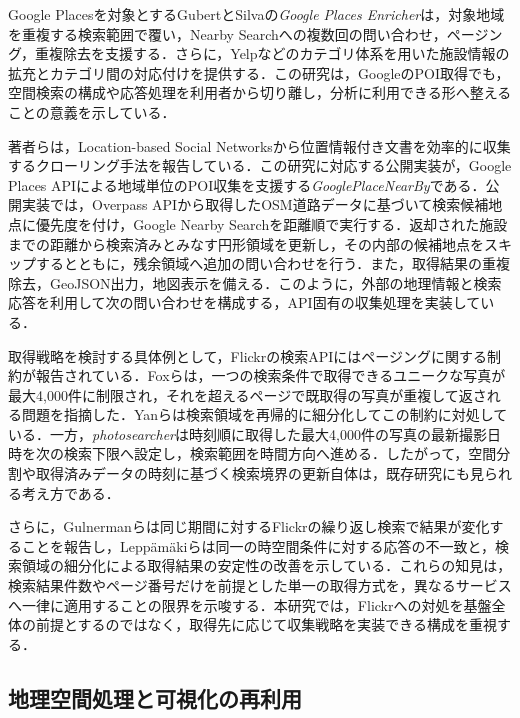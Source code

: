 Google Placesを対象とするGubertとSilvaの\textit{Google Places Enricher}は，対象地域を重複する検索範囲で覆い，Nearby Searchへの複数回の問い合わせ，ページング，重複除去を支援する．さらに，Yelpなどのカテゴリ体系を用いた施設情報の拡充とカテゴリ間の対応付けを提供する\cite{gubert2022placesenricher}．この研究は，GoogleのPOI取得でも，空間検索の構成や応答処理を利用者から切り離し，分析に利用できる形へ整えることの意義を示している．

著者らは，Location-based Social Networksから位置情報付き文書を効率的に収集するクローリング手法を報告している\cite{yokoyama2019efficientcrawling}．この研究に対応する公開実装が，Google Places APIによる地域単位のPOI収集を支援する\textit{GooglePlaceNearBy}である\cite{yokoyama2020googleplacenearby}．公開実装では，Overpass APIから取得したOSM道路データに基づいて検索候補地点に優先度を付け，Google Nearby Searchを距離順で実行する．返却された施設までの距離から検索済みとみなす円形領域を更新し，その内部の候補地点をスキップするとともに，残余領域へ追加の問い合わせを行う．また，取得結果の重複除去，GeoJSON出力，地図表示を備える．このように，外部の地理情報と検索応答を利用して次の問い合わせを構成する，API固有の収集処理を実装している．

取得戦略を検討する具体例として，Flickrの検索APIにはページングに関する制約が報告されている．Foxらは，一つの検索条件で取得できるユニークな写真が最大4,000件に制限され，それを超えるページで既取得の写真が重複して返される問題を指摘した\cite{fox2020photosearcher}．Yanらは検索領域を再帰的に細分化してこの制約に対処している\cite{yan2017postdisaster,yan2019flickrtags}．一方，\textit{photosearcher}は時刻順に取得した最大4,000件の写真の最新撮影日時を次の検索下限へ設定し，検索範囲を時間方向へ進める\cite{fox2020photosearcher}．したがって，空間分割や取得済みデータの時刻に基づく検索境界の更新自体は，既存研究にも見られる考え方である．

さらに，Gulnermanらは同じ期間に対するFlickrの繰り返し検索で結果が変化することを報告し\cite{gulnerman2024antarctica}，Lepp{\"a}m{\"a}kiらは同一の時空間条件に対する応答の不一致と，検索領域の細分化による取得結果の安定性の改善を示している\cite{leppamaki2025flickr}．これらの知見は，検索結果件数やページ番号だけを前提とした単一の取得方式を，異なるサービスへ一律に適用することの限界を示唆する．本研究では，Flickrへの対処を基盤全体の前提とするのではなく，取得先に応じて収集戦略を実装できる構成を重視する．

\subsection{地理空間処理と可視化の再利用}

